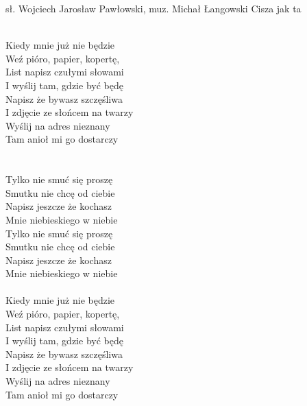 {sł. Wojciech Jarosław Pawłowski, muz. Michał Łangowski}
{Cisza jak ta}
\begin{text}
\vin \\
Kiedy mnie już nie będzie\\
Weź pióro, papier, kopertę,\\
List napisz czułymi słowami\\
I wyślij tam, gdzie być będę\\

Napisz że bywasz szczęśliwa\\
I zdjęcie ze słońcem na twarzy\\
Wyślij na adres nieznany\\
Tam anioł mi go dostarczy\\
\vin\\
\vin\\

\vin Tylko nie smuć się proszę\\
\vin Smutku nie chcę od ciebie\\
\vin Napisz jeszcze że kochasz\\
\vin Mnie niebieskiego w niebie\\

\vin Tylko nie smuć się proszę\\
\vin Smutku nie chcę od ciebie\\
\vin Napisz jeszcze że kochasz\\
\vin Mnie niebieskiego w niebie\\
\vin\\

Kiedy mnie już nie będzie\\
Weź pióro, papier, kopertę,\\
List napisz czułymi słowami\\
I wyślij tam, gdzie być będę\\

Napisz że bywasz szczęśliwa\\
I zdjęcie ze słońcem na twarzy\\
Wyślij na adres nieznany\\
Tam anioł mi go dostarczy\\
\end{text}
